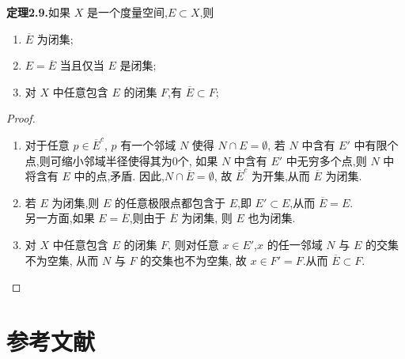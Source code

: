 \documentclass{article}
\begin{document}
\textbf{定理2.9.}如果 $X$ 是一个度量空间,$E\subset X$,则
\begin{enumerate}[label={\textbullet}]
    \item $\overline{E}$ 为闭集;
    \item $E = \overline{E}$ 当且仅当 $E$ 是闭集;
    \item 对 $X$ 中任意包含 $E$ 的闭集 $F$,有 $\overline{E} \subset F$;
\end{enumerate}
\begin{proof}
    $ $
    \begin{enumerate}[label={\textbullet}]
        \item 对于任意 $p\in \overline{E}^c$,
        $p$ 有一个邻域 $N$ 使得 $N\cap E = \emptyset$,
        若 $N$ 中含有 $E'$ 中有限个点,则可缩小邻域半径使得其为0个,
        如果 $N$ 中含有 $E'$ 中无穷多个点,则 $N$ 中将含有 $E$ 中的点,矛盾.
        因此,$N\cap \overline{E} = \emptyset$,
        故 $\overline{E}^c$ 为开集,从而 $\overline{E}$ 为闭集.
        \item 若 $E$ 为闭集,则 $E$ 的任意极限点都包含于 $E$,即
        $E'\subset E$,从而 $\overline{E} = E$.\\
        另一方面,如果 $E = \overline{E}$,则由于 $\overline{E}$ 为闭集,
        则 $E$ 也为闭集.
        \item 对 $X$ 中任意包含 $E$ 的闭集 $F$,
        则对任意 $x\in E'$,$x$ 的任一邻域 $N$ 与 $E$ 的交集不为空集,
        从而 $N$ 与 $F$ 的交集也不为空集,
        故 $x\in F'=F$.从而 $\overline{E} \subset F$.
    \end{enumerate}
\end{proof}

\renewcommand{\refname}{} %
\section*{参考文献} %

\vspace{-2em} %

\nocite{*} %

\end{document}

